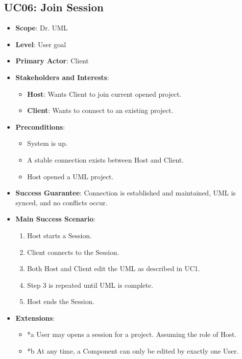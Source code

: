 \documentclass[12pt]{article}
\begin{document}
    \subsection{UC06: Join Session}
    \begin{itemize}
        \item \textbf{Scope}: Dr. UML
        \item \textbf{Level}: User goal
        \item \textbf{Primary Actor}: Client
        \item \textbf{Stakeholders and Interests}:
        \begin{itemize}
            \item \textbf{Host}: Wants Client to join current opened project.
            \item \textbf{Client}: Wants to connect to an existing project.
        \end{itemize}
        \item \textbf{Preconditions}:
        \begin{itemize}
            \item System is up.
            \item A stable connection exists between Host and Client.
            \item Host opened a UML project.
        \end{itemize}
        \item \textbf{Success Guarantee}: Connection is established and maintained, UML is synced, and no conflicts occur.
        \item \textbf{Main Success Scenario}:
        \begin{enumerate}
            \item Host starts a Session.
            \item Client connects to the Session.
            \item Both Host and Client edit the UML as described in UC1.
            \item Step 3 is repeated until UML is complete.
            \item Host ends the Session.
        \end{enumerate}
        \item \textbf{Extensions}:
        \begin{itemize}
            \item *a User may opens a session for a project. Assuming the role of Host.
            \item *b At any time, a Component can only be edited by exactly one User.

\end{itemize}
\end{itemize}
\end{document}
